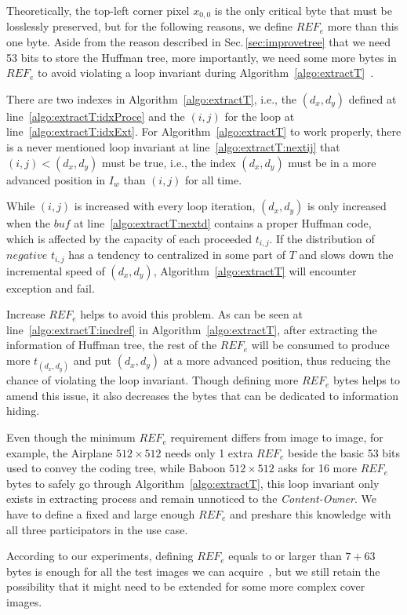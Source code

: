 Theoretically, the top-left corner pixel $x_{0, 0}$ is the only critical byte that must be losslessly preserved, but for the following reasons, we define $REF_e$ more than this one byte.
Aside from the reason described in Sec.\,\ref{sec:improvetree} that we need 53 bits to store the Huffman tree, 
more importantly, we need some more bytes in $REF_e$ to avoid violating a loop invariant during Algorithm~\ref{algo:extractT}~\cite{Furia2014}.

There are two indexes in Algorithm~\ref{algo:extractT}, i.e., the $(d_x, d_y)$ defined at line~\ref{algo:extractT:idxProce} and the $(i, j)$ for the loop at line~\ref{algo:extractT:idxExt}. 
For Algorithm~\ref{algo:extractT} to work properly, there is a never mentioned loop invariant at line~\ref{algo:extractT:nextij} that $(i, j) < (d_x, d_y)$ must be true, i.e., the index $(d_x, d_y)$ must be in a more advanced position in $I_w$ than $(i, j)$ for all time.

While $(i, j)$ is increased with every loop iteration, $(d_x, d_y)$ is only increased when the $buf$ at line~\ref{algo:extractT:nextd} contains a proper Huffman code, which is affected by the capacity of each proceeded $t_{i, j}$.
If the distribution of $negative$ $t_{i, j}$ has a tendency to centralized in some part of $T$ and slows down the incremental speed of $(d_x, d_y)$, Algorithm~\ref{algo:extractT} will encounter exception and fail.

Increase $REF_e$ helps to avoid this problem. 
As can be seen at line~\ref{algo:extractT:incdref} in Algorithm~\ref{algo:extractT}, after extracting the information of Huffman tree, the rest of the $REF_e$ will be consumed to produce more $t_{(d_x, d_y)}$ and put $(d_x, d_y)$ at a more advanced position, thus reducing the chance of violating the loop invariant.
Though defining more $REF_e$ bytes helps to amend this issue, it also decreases the bytes that can be dedicated to information hiding.

Even though the minimum $REF_e$ requirement differs from image to image, for example, the Airplane $512 \times 512$ needs only 1 extra $REF_e$ beside the basic 53 bits used to convey the coding tree, while Baboon $512 \times 512$ asks for 16 more $REF_e$ bytes to safely go through Algorithm~\ref{algo:extractT}, this loop invariant only exists in extracting process and remain unnoticed to the \emph{Content-Owner}.
We have to define a fixed and large enough $REF_e$ and preshare this knowledge with all three participators in the use case. 

According to our experiments, defining $REF_e$ equals to or larger than $7 + 63$ bytes is enough for all the test images we can acquire~\cite{UniversityofSouthernCalifornia2020, Bas2011, Filler2010}, but we still retain the possibility that it might need to be extended for some more complex cover images.


